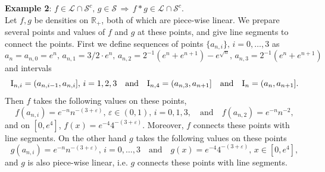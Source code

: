 \documentclass[12pt,leqno]{amsart}
\newcommand{\rI}{{\rm I}}
\newcommand{\R}{\mathbb{R}}
\newcommand{\vep}{\varepsilon}
\newcommand{\cals}{{\mathcal S}}
\newcommand{\call}{{\mathcal L}}
\newcommand{\1}{{\mathbf 1}}
\begin{document}
\noindent
{\bf Example 2}: $f \in \call \cap \cals^c,\,g\in\cals\, \Rightarrow\, f\ast g \in \call \cap \cals^c$. \\
Let $f,g$ be densities on $\R_+$, both of which are piece-wise linear.   
We prepare several points and values of $f$ and $g$ at these points, and give line segments to 
connect the points. 
First we define sequences of points $\{a_{n,i}\},\,i=0,\ldots,3$ as 
\[
a_n=a_{n,0}= e^n,%
\,a_{n,1}=3/2\cdot e^n,\,a_{n,2}= 2^{-1}(e^n+e^{n+1})-e^{\sqrt{n}},\,
a_{n,3}=2^{-1}(e^n+e^{n+1})
\]
and intervals 
\[
 \rI_{n,i}=(a_{n,i-1},a_{n,i}],\,i=1,2,3\quad \text{and}\quad \rI_{n,4}=(a_{n,3},a_{n+1}]\quad \text{and}\quad \rI_n= (a_n,a_{n+1}]. 
\]
Then $f$ takes the following values on these points, 
\[
f(a_{n,i})=e^{-n}n^{-(3+\vep)},\,\vep\in (0,1),\, i=0,1,3, 
\quad \text{and}\quad f(a_{n,2})= e^{-n}n^{-2},%
\]
and on $[0,e^4]$, $f(x)=e^{-4}4^{-(3+\vep)}$. Moreover, $f$ connects these points with line segments. 
On the other hand $g$ takes the following values on these points 
\[
g(a_{n,i})=e^{-n}n^{-(3+\vep)},\, i=0,\ldots,3  
\quad \text{and}\quad 
g(x)=e^{-4}4^{-(3+\vep)},\,x\in [0,e^{4}], 
\]
and $g$ is also piece-wise linear, i.e. $g$ connects these points with line segments.
\end{document}
